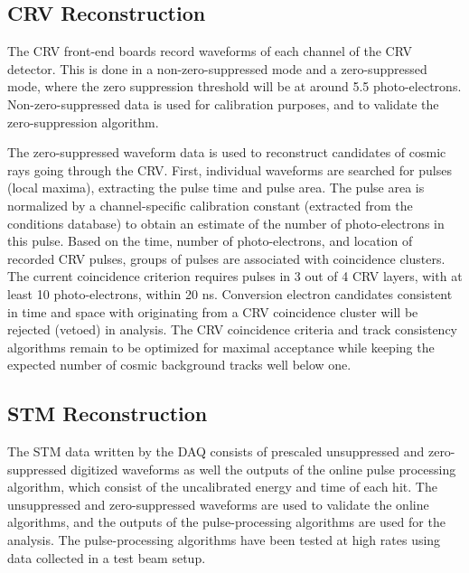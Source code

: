 \subsection{CRV Reconstruction}
The CRV front-end boards record waveforms of each channel of the CRV detector. This is done in a non-zero-suppressed mode and a zero-suppressed mode, where the zero suppression threshold will be at around 5.5 photo-electrons. Non-zero-suppressed data is used for calibration purposes, and to validate the zero-suppression algorithm.

The zero-suppressed waveform data is used to reconstruct candidates of cosmic rays going through the CRV. First, individual waveforms are searched for pulses (local maxima), extracting the pulse time and pulse area. The pulse area is normalized by a channel-specific calibration constant (extracted from the conditions database) to obtain an estimate of the number of photo-electrons in this pulse.
Based on the time, number of photo-electrons, and location of recorded CRV pulses, groups of pulses are associated with coincidence clusters. The current coincidence criterion requires pulses in 3 out of 4 CRV layers, with at least 10 photo-electrons, within 20 ns. Conversion electron candidates consistent in time and space with originating from a CRV coincidence cluster will be rejected (vetoed) in analysis. %
The CRV coincidence criteria and track consistency algorithms remain to be optimized for maximal acceptance while keeping the expected number of cosmic background tracks well below one.

\subsection{STM Reconstruction}
The STM data written by the DAQ consists of prescaled unsuppressed and zero-suppressed digitized waveforms as well the outputs of the online pulse processing algorithm, which consist of the uncalibrated energy and time of each hit. The unsuppressed and zero-suppressed waveforms are used to validate the online algorithms, and the outputs of the pulse-processing algorithms are used for the analysis. The pulse-processing algorithms have been tested at high rates using data collected in a test beam setup.


